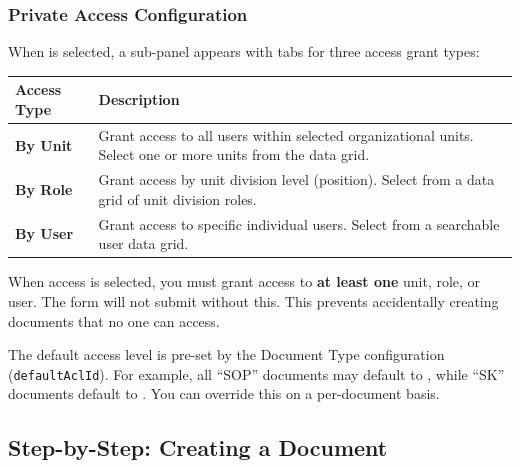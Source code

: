\subsubsection*{Private Access Configuration}

When  is selected, a sub-panel appears with
tabs for three access grant types:

\begin{tabularx}{\textwidth}{@{} l X @{}}
  \toprule
  \textbf{Access Type} & \textbf{Description} \\
  \midrule
  \textbf{By Unit}
    & Grant access to all users within selected
      organizational units. Select one or more units
      from the data grid. \\
  \textbf{By Role}
    & Grant access by unit division level (position).
      Select from a data grid of unit division roles. \\
  \textbf{By User}
    & Grant access to specific individual users. Select
      from a searchable user data grid. \\
  \bottomrule
\end{tabularx}

\begin{ugImportant}
  When  access is selected, you must grant
  access to \textbf{at least one} unit, role, or user. The
  form will not submit without this. This prevents accidentally
  creating documents that no one can access.
\end{ugImportant}

\begin{ugTip}
  The default access level is pre-set by the Document Type
  configuration (\texttt{defaultAclId}). For example, all
  ``SOP'' documents may default to , while
  ``SK'' documents default to . You can
  override this on a per-document basis.
\end{ugTip}

\subsection{Step-by-Step: Creating a Document}

